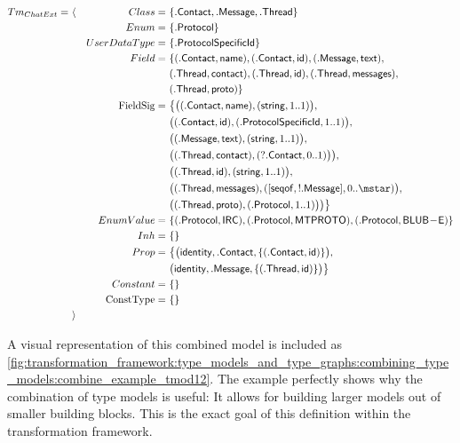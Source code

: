 \begin{align*}
Tm_{ChatExt} =\ &\langle&
Class =\ &\{ \type{.Contact}, \type{.Message}, \type{.Thread} \} \\&&
Enum =\ &\{ \type{.Protocol} \} \\&&
UserDataType =\ &\{ \type{.ProtocolSpecificId} \} \\&&
Field =\ &\{
( \type{.Contact}, \type{name} ), 
( \type{.Contact}, \type{id} ),
( \type{.Message}, \type{text} ),\\&&&
( \type{.Thread}, \type{contact} ),
( \type{.Thread}, \type{id} ),
( \type{.Thread}, \type{messages} ),\\&&& 
( \type{.Thread}, \type{proto} )\} \\&&
\mathrm{FieldSig} =\ &\big\{
\big( ( \type{.Contact}, \type{name} ), ( \type{string}, 1..1 ) \big),\\&&& \big( ( \type{.Contact}, \type{id} ), ( \type{.ProtocolSpecificId}, 1..1 ) \big),\\&&& 
\big( ( \type{.Message}, \type{text} ), ( \type{string}, 1..1 ) \big),\\&&&
\big( ( \type{.Thread}, \type{contact} ), ( ?\type{.Contact}, 0..1 ) \big) \big),\\&&&
\big( ( \type{.Thread}, \type{id} ), ( \type{string}, 1..1 ) \big),\\&&& 
\big( ( \type{.Thread}, \type{messages} ), ( [ \type{seqof}, !\type{.Message} ], 0..\mstar ) \big),\\&&& 
\big( ( \type{.Thread}, \type{proto} ), ( \type{.Protocol}, 1..1 ) \big) \big)
\big\} \\&&
EnumValue =\ &\{
( \type{.Protocol}, \type{IRC} ), 
( \type{.Protocol}, \type{MTPROTO} ), 
( \type{.Protocol}, \type{BLUB\!-\!E} )\} \\&&
Inh =\ &\{\} \\&&
Prop =\ &\big\{
\big( \type{identity}, \type{.Contact}, \{( \type{.Contact}, \type{id} )\} \big),\\&&&
\big( \type{identity}, \type{.Message}, \{( \type{.Thread}, \type{id} )\} \big)
\big\} \\&&
Constant =\ &\{\} \\&&
\mathrm{ConstType} =\ &\{\}
\\&\rangle
\end{align*}

A visual representation of this combined model is included as \cref{fig:transformation_framework:type_models_and_type_graphs:combining_type_models:combine_example_tmod12}. The example perfectly shows why the combination of type models is useful: It allows for building larger models out of smaller building blocks. This is the exact goal of this definition within the transformation framework.

